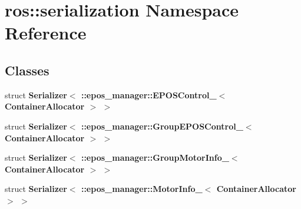 \section{ros\-:\-:serialization \-Namespace \-Reference}
\label{namespaceros_1_1serialization}
\subsection*{\-Classes}
\begin{DoxyCompactItemize}
\item 
struct {\bf \-Serializer$<$ \-::epos\-\_\-manager\-::\-E\-P\-O\-S\-Control\-\_\-$<$ Container\-Allocator $>$ $>$}
\item 
struct {\bf \-Serializer$<$ \-::epos\-\_\-manager\-::\-Group\-E\-P\-O\-S\-Control\-\_\-$<$ Container\-Allocator $>$ $>$}
\item 
struct {\bf \-Serializer$<$ \-::epos\-\_\-manager\-::\-Group\-Motor\-Info\-\_\-$<$ Container\-Allocator $>$ $>$}
\item 
struct {\bf \-Serializer$<$ \-::epos\-\_\-manager\-::\-Motor\-Info\-\_\-$<$ Container\-Allocator $>$ $>$}
\end{DoxyCompactItemize}
